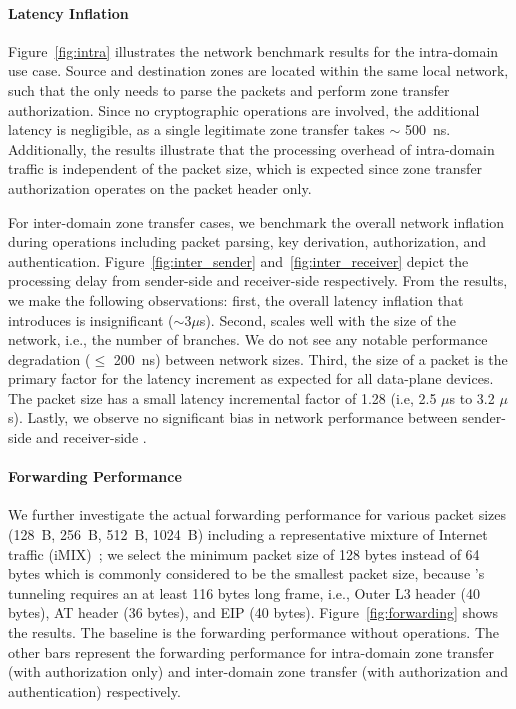 \paragraph{Latency Inflation}
Figure~\ref{fig:intra} illustrates the network benchmark results for the intra-domain use case.
Source and destination zones are located within the same local network, such that
the \tp only needs to parse the packets and perform zone transfer authorization. Since no cryptographic operations are involved,
the additional latency is negligible, as a single legitimate zone transfer takes $\sim$
\SI{500}{ns}. Additionally, the results illustrate that the processing overhead of intra-domain traffic
is independent of the packet size, which is expected since zone transfer authorization operates on the packet header only.

For inter-domain zone transfer cases, we benchmark the overall network inflation during \tp
operations including packet parsing, key derivation, authorization, and authentication.
Figure~\ref{fig:inter_sender} and~\ref{fig:inter_receiver} depict the processing delay from
sender-side \tp and receiver-side \tp respectively.
From the results, we make the following observations: first, the overall latency inflation that
\name introduces is insignificant ($\sim 3 \mu$s). Second, \name scales well with the size of the
network, i.e., the number of branches. We do not see any notable performance degradation
($\leq$ \SI{200}{ns}) between network sizes. Third, the size of a packet is the primary factor for the latency increment
as expected for all data-plane devices. The packet size has a small latency incremental factor of
1.28 (i.e, 2.5 $\mu$s to 3.2 $\mu$s). Lastly, we observe no significant bias in network
performance between sender-side and receiver-side \tps.


\paragraph{Forwarding Performance}
We further investigate the actual forwarding performance for various packet sizes (\SI{128}{B},
\SI{256}{B}, \SI{512}{B}, \SI{1024}{B}) including a representative mixture of Internet traffic
(iMIX)~\cite{rfc6985}; we select the minimum packet size of 128 bytes instead of 64 bytes which is
commonly considered to be the smallest packet size, because \name's tunneling requires an at least 116
bytes long frame, i.e., Outer L3 header (40 bytes), AT header
(36 bytes), and EIP (40 bytes). Figure~\ref{fig:forwarding} shows the results. The
baseline is the forwarding performance without \tp operations. The other bars represent the
forwarding performance for intra-domain zone transfer (with authorization only) and inter-domain
zone transfer (with authorization and authentication) respectively.

